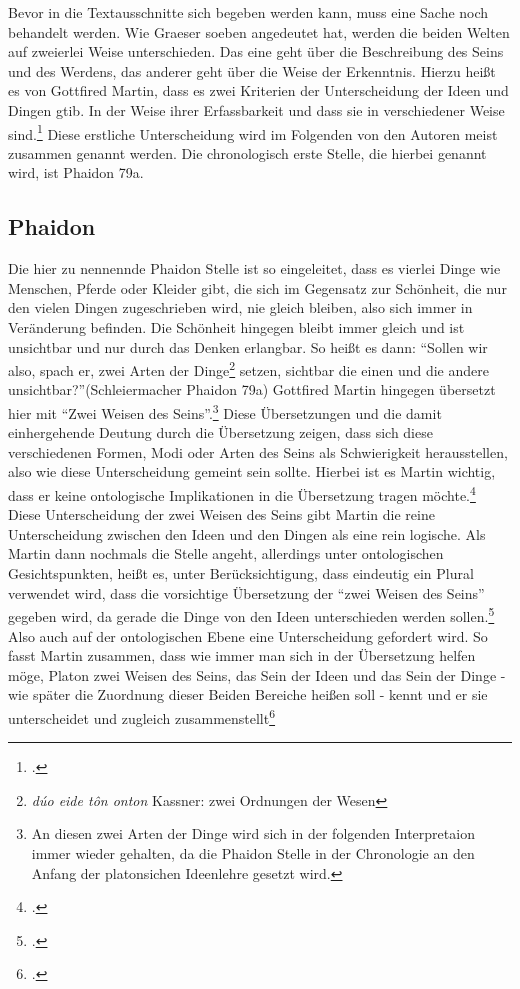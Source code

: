 Bevor in die Textausschnitte sich begeben werden kann, muss eine Sache noch behandelt werden. Wie Graeser soeben angedeutet hat, werden die beiden Welten auf zweierlei Weise unterschieden. Das eine geht über die Beschreibung des Seins und des Werdens, das anderer geht über die Weise der Erkenntnis. Hierzu heißt es von Gottfired Martin, dass es zwei Kriterien der Unterscheidung der Ideen und Dingen gtib. In der Weise ihrer Erfassbarkeit und dass sie in verschiedener Weise sind.\footcite[vgl.][S. 40]{Martin73}
Diese erstliche Unterscheidung wird im Folgenden von den Autoren meist zusammen genannt werden. Die chronologisch erste Stelle, die hierbei genannt wird, ist Phaidon 79a.
\subsection{Phaidon}
Die hier zu nennennde Phaidon Stelle ist so eingeleitet, dass es vierlei Dinge wie Menschen, Pferde oder Kleider gibt, die sich im Gegensatz zur Schönheit, die nur den vielen Dingen zugeschrieben wird, nie gleich bleiben, also sich immer in Veränderung befinden. Die Schönheit hingegen bleibt immer gleich und ist unsichtbar und nur durch das Denken erlangbar.
So heißt es dann: \enquote{Sollen wir also, spach er, zwei Arten der Dinge\footnote{\emph{dúo eide tôn onton}  Kassner: zwei Ordnungen der Wesen\nocite{PhaidonKassner}} setzen, sichtbar die einen und die andere unsichtbar?}(Schleiermacher \nocite{PhaidonSchleiermacher}Phaidon 79a)
Gottfired Martin hingegen übersetzt hier mit \enquote{Zwei Weisen des Seins}.\footnote{An diesen zwei Arten der Dinge wird sich in der folgenden Interpretaion immer wieder gehalten, da die Phaidon Stelle in der Chronologie an den Anfang der platonsichen Ideenlehre gesetzt wird.}
Diese Übersetzungen und die damit einhergehende Deutung durch die Übersetzung zeigen, dass sich diese verschiedenen Formen, Modi oder Arten des Seins als Schwierigkeit herausstellen, also wie diese Unterscheidung gemeint sein sollte. Hierbei ist es Martin wichtig, dass er keine ontologische Implikationen in die Übersetzung tragen möchte.\footcite[vgl.][S. 37]{Martin73} Diese Unterscheidung der zwei Weisen des Seins gibt Martin die reine Unterscheidung zwischen den Ideen und den Dingen als eine rein logische. 
Als Martin dann nochmals die Stelle angeht, allerdings unter ontologischen Gesichtspunkten, heißt es, unter Berücksichtigung, dass eindeutig ein Plural verwendet wird, dass die vorsichtige Übersetzung der \enquote{zwei Weisen des Seins} gegeben wird, da gerade die Dinge von den Ideen unterschieden werden sollen.\footcite[vgl.][S. 216]{Martin73} Also auch auf der ontologischen Ebene eine Unterscheidung gefordert wird. So fasst Martin zusammen, dass wie immer man sich in der Übersetzung helfen möge, Platon zwei Weisen des Seins, das Sein der Ideen und das Sein der Dinge - wie später die Zuordnung dieser Beiden Bereiche heißen soll - kennt und er sie unterscheidet und zugleich zusammenstellt\footcite[vgl.][S. 216]{Martin73}
